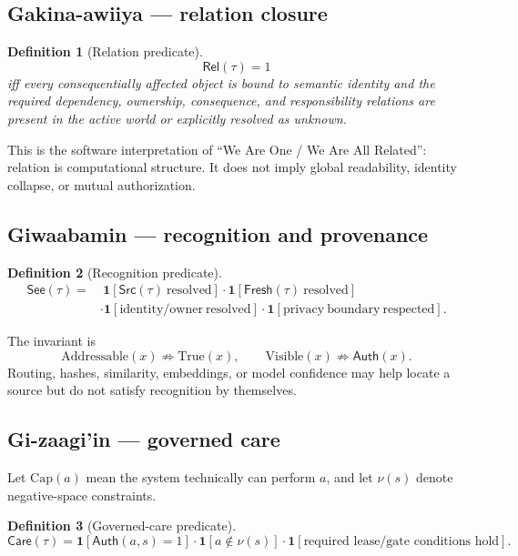 \documentclass[11pt]{article}
\newtheorem{definition}{Definition}
\newcommand{\Rel}{\mathsf{Rel}}
\newcommand{\See}{\mathsf{See}}
\newcommand{\Care}{\mathsf{Care}}
\newcommand{\Auth}{\mathsf{Auth}}
\newcommand{\Src}{\mathsf{Src}}
\newcommand{\Fresh}{\mathsf{Fresh}}
\newcommand{\one}{\mathbf{1}}
\begin{document}
\subsection{Gakina-awiiya --- relation closure}

\begin{definition}[Relation predicate]
\[
\Rel(\tau)=1
\]
iff every consequentially affected object is bound to semantic identity and the
required dependency, ownership, consequence, and responsibility relations are
present in the active world or explicitly resolved as unknown.
\end{definition}

This is the software interpretation of ``We Are One / We Are All Related'':
relation is computational structure.  It does not imply global readability,
identity collapse, or mutual authorization.

\subsection{Giwaabamin --- recognition and provenance}

\begin{definition}[Recognition predicate]
\[
\begin{aligned}
\See(\tau)=&\ \one[\Src(\tau)\ \mathrm{resolved}]
\cdot\one[\Fresh(\tau)\ \mathrm{resolved}]\\
&\cdot\one[\mathrm{identity/owner}\ \mathrm{resolved}]
\cdot\one[\mathrm{privacy\ boundary}\ \mathrm{respected}].
\end{aligned}
\]
\end{definition}

The invariant is
\[
\mathrm{Addressable}(x)\not\Rightarrow\mathrm{True}(x),\qquad
\mathrm{Visible}(x)\not\Rightarrow\Auth(x).
\]
Routing, hashes, similarity, embeddings, or model confidence may help locate a
source but do not satisfy recognition by themselves.

\subsection{Gi-zaagi'in --- governed care}

Let \(\mathrm{Cap}(a)\) mean the system technically can perform \(a\), and let
\(\nu(s)\) denote negative-space constraints.

\begin{definition}[Governed-care predicate]
\[
\Care(\tau)=
\one[\Auth(a,s)=1]
\cdot
\one[a\notin\nu(s)]
\cdot
\one[\text{required lease/gate conditions hold}].
\]
\end{definition}
\end{document}
